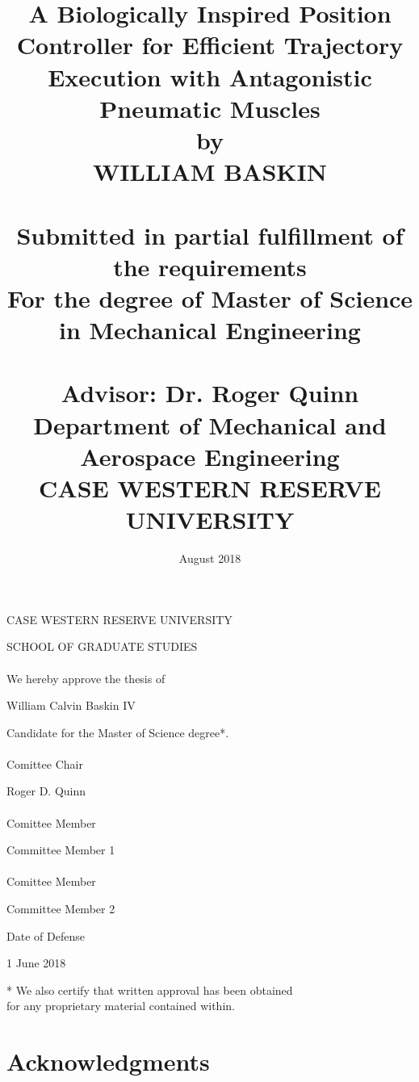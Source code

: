 \documentclass[12pt, letterpaper, oneside, onecolumn]{report} %
\title{
  {A Biologically Inspired Position Controller for Efficient Trajectory Execution with Antagonistic Pneumatic Muscles}\\
  {\large by \\
  WILLIAM BASKIN \\~\\
  Submitted in partial fulfillment of the requirements\\
  For the degree of Master of Science in Mechanical Engineering\\~\\
  Advisor: Dr. Roger Quinn\\
  Department of Mechanical and Aerospace Engineering\\
  CASE WESTERN RESERVE UNIVERSITY}\\
}
\date{August 2018}
\begin{document}
\maketitle

\newpage

\begin{center}
CASE WESTERN RESERVE UNIVERSITY

SCHOOL OF GRADUATE STUDIES \\~\\

\hspace{-\parindent}We hereby approve the thesis of

William Calvin Baskin IV

\hspace{-\parindent}Candidate for the Master of Science degree*.\\~\\

Comittee Chair

Roger D. Quinn\\~\\


Comittee Member

Committee Member 1\\~\\

Comittee Member

Committee Member 2

\vfill

Date of Defense

1 June 2018

* We also certify that written approval has been obtained\\for any proprietary material contained within.
\end{center}

\newpage

\tableofcontents

\listoffigures

\chapter*{Acknowledgments}
\label{chap:acknowledgements}
\end{document}
